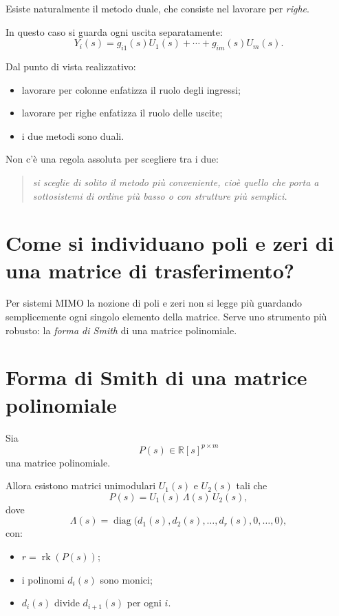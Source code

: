 Esiste naturalmente il metodo duale, che consiste nel lavorare per \emph{righe}.

In questo caso si guarda ogni uscita separatamente:
\[
Y_i(s)=g_{i1}(s)U_1(s)+\cdots+g_{im}(s)U_m(s).
\]

Dal punto di vista realizzativo:
\begin{itemize}
    \item lavorare per colonne enfatizza il ruolo degli ingressi;
    \item lavorare per righe enfatizza il ruolo delle uscite;
    \item i due metodi sono duali.
\end{itemize}

Non c'è una regola assoluta per scegliere tra i due:
\begin{quote}
\emph{si sceglie di solito il metodo più conveniente, cioè quello che porta a sottosistemi di ordine più basso o con strutture più semplici.}
\end{quote}

\bigskip

\section{Come si individuano poli e zeri di una matrice di trasferimento?}

Per sistemi MIMO la nozione di poli e zeri non si legge più guardando semplicemente ogni singolo elemento della matrice. Serve uno strumento più robusto: la \emph{forma di Smith} di una matrice polinomiale.

\section{Forma di Smith di una matrice polinomiale}

Sia
\[
P(s)\in \mathbb R[s]^{p\times m}
\]
una matrice polinomiale.

Allora esistono matrici unimodulari \(U_1(s)\) e \(U_2(s)\) tali che
\[
P(s)=U_1(s)\,\Lambda(s)\,U_2(s),
\]
dove
\[
\Lambda(s)=
\operatorname{diag}\bigl(d_1(s),d_2(s),\dots,d_r(s),0,\dots,0\bigr),
\]
con:
\begin{itemize}
    \item \(r=\operatorname{rk}(P(s))\);
    \item i polinomi \(d_i(s)\) sono monici;
    \item \(d_i(s)\) divide \(d_{i+1}(s)\) per ogni \(i\).
\end{itemize}

